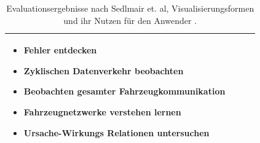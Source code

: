 \documentclass[draft=false
              ,paper=a4
              ,twoside=false
              ,fontsize=11pt
              ,headsepline
              ,BCOR10mm
              ,DIV11
              ]{scrbook}
\begin{document}
\begin{table}[htbp]
\begin{tabularx}{\textwidth}{X|l|X|p{5cm}}
    \begin{itemize}[noitemsep,nolistsep]
      \item Fehler entdecken
      \item Zyklischen Datenverkehr beobachten
      \item Beobachten gesamter Fahrzeugkommunikation
      \item Fahrzeugnetzwerke verstehen lernen
      \item Ursache-Wirkungs Relationen untersuchen
    \end{itemize} \\ \hline   
  \end{tabularx}
  \caption{Evaluationsergebnisse nach Sedlmair et. al, Visualisierungsformen und ihr Nutzen für den Anwender \cite{sedlmair2009}.}
    \label{tab:eval}
\end{table}
\end{document}
